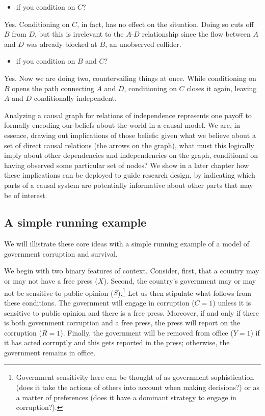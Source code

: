 \documentclass[12pt,]{book}
\providecommand{\tightlist}{%
  \setlength{\itemsep}{0pt}\setlength{\parskip}{0pt}}
\let\rmarkdownfootnote\footnote%
\def\footnote{\protect\rmarkdownfootnote}
\begin{document}
\begin{itemize}
\tightlist
\item
  if you condition on \(C\)?
\end{itemize}

Yes. Conditioning on \(C\), in fact, has no effect on the situation. Doing so cuts off \(B\) from \(D\), but this is irrelevant to the \(A\)-\(D\) relationship since the flow between \(A\) and \(D\) was already blocked at \(B\), an unobserved collider.

\begin{itemize}
\tightlist
\item
  if you condition on \(B\) and \(C\)?
\end{itemize}

Yes. Now we are doing two, countervailing things at once. While conditioning on \(B\) opens the path connecting \(A\) and \(D\), conditioning on \(C\) closes it again, leaving \(A\) and \(D\) conditionally independent.

Analyzing a causal graph for relations of independence represents one payoff to formally encoding our beliefs about the world in a causal model. We are, in essence, drawing out implications of those beliefs: given what we believe about a set of direct causal relations (the arrows on the graph), what must this logically imply about other dependencies and independencies on the graph, conditional on having observed some particular set of nodes? We show in a later chapter how these implications can be deployed to guide research design, by indicating which parts of a causal system are potentially informative about other parts that may be of interest.

\hypertarget{a-simple-running-example}{%
\subsection{A simple running example}\label{a-simple-running-example}}

We will illistrate these core ideas with a simple running example of a model of government corruption and survival.

We begin with two binary features of context. Consider, first, that a country may or may not have a free press (\(X\)). Second, the country's government may or may not be sensitive to public opinion (\(S\)).\footnote{Government sensitivity here can be thought of as government sophistication (does it take the actions of others into account when making decisions?) or as a matter of preferences (does it have a dominant strategy to engage in corruption?).} Let us then stipulate what follows from these conditions. The government will engage in corruption (\(C=1\)) unless it is sensitive to public opinion and there is a free press. Moreover, if and only if there is both government corruption and a free press, the press will report on the corruption (\(R=1\)). Finally, the government will be removed from office (\(Y=1\)) if it has acted corruptly and this gets reported in the press; otherwise, the government remains in office.
\end{document}
